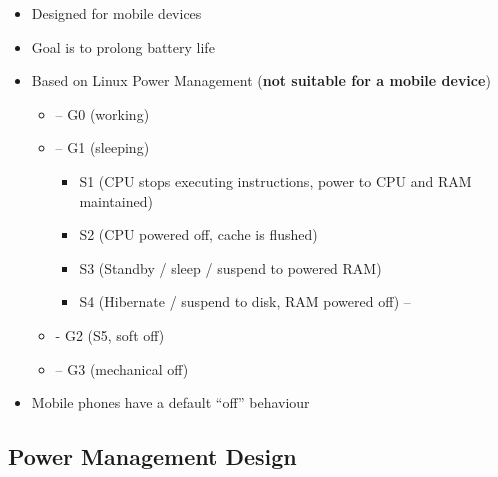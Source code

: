 \documentclass{article}
\begin{document}
\begin{itemize}
  \item  Designed for mobile devices 
  \item Goal is to prolong battery life 
  \item Based on Linux Power Management (\textbf{not suitable for a mobile device})
  \begin{itemize}
    \item – G0 (working) 
    \item – G1 (sleeping)
    \begin{itemize}
      \item S1 (CPU stops executing instructions, power to CPU and RAM maintained) 
      \item S2 (CPU powered off, cache is flushed) 
      \item S3 (Standby / sleep / suspend to powered RAM) 
      \item S4 (Hibernate / suspend to disk, RAM powered off) –
    \end{itemize}
    \item - G2 (S5, soft off) 
    \item – G3 (mechanical off) 
   \end{itemize}  
  \item Mobile phones have a default “off” behaviour
\end{itemize}

\subsection{Power Management Design}
\end{document}
